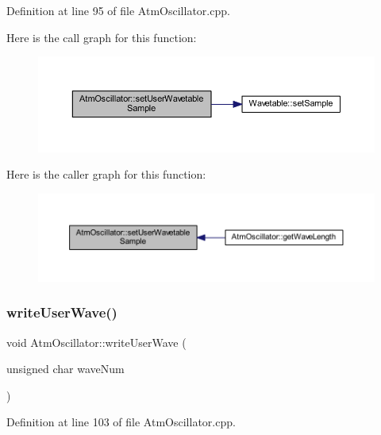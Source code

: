 Definition at line 95 of file Atm\+Oscillator.\+cpp.

Here is the call graph for this function\+:
\nopagebreak
\begin{figure}[H]
\begin{center}
\leavevmode
\includegraphics[width=350pt]{class_atm_oscillator_aa62dba14693f65adcb3daa7aa4757ba1_cgraph}
\end{center}
\end{figure}
Here is the caller graph for this function\+:
\nopagebreak
\begin{figure}[H]
\begin{center}
\leavevmode
\includegraphics[width=350pt]{class_atm_oscillator_aa62dba14693f65adcb3daa7aa4757ba1_icgraph}
\end{center}
\end{figure}
\mbox{\label{class_atm_oscillator_a92133ff9c3b34a6acb703f0d6d95cd71}} 
\subsubsection{\texorpdfstring{write\+User\+Wave()}{writeUserWave()}}
{\footnotesize\ttfamily void Atm\+Oscillator\+::write\+User\+Wave (\begin{DoxyParamCaption}\item[{unsigned char}]{wave\+Num }\end{DoxyParamCaption})}



Definition at line 103 of file Atm\+Oscillator.\+cpp.

